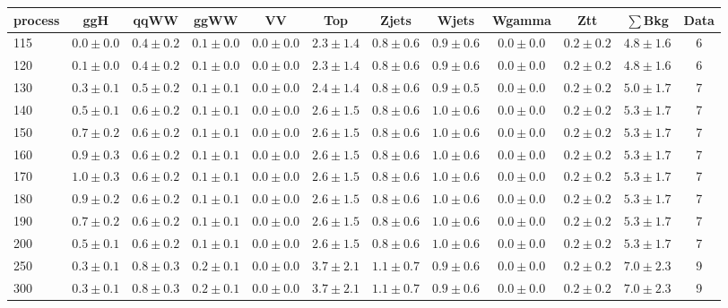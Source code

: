 \begin{table}
{\footnotesize
 \begin{center}
 \begin{tabular}{l c c c c c c c c c c c }
 \hline
 process & ggH & qqWW & ggWW & VV & Top & Zjets & Wjets & Wgamma & Ztt & $\sum$Bkg & Data \\
 \hline
115 & $0.0\pm0.0$ & $0.4\pm0.2$ & $0.1\pm0.0$ & $0.0\pm0.0$ & $2.3\pm1.4$ & $0.8\pm0.6$ & $0.9\pm0.6$ & $0.0\pm0.0$ & $0.2\pm0.2$ & $4.8\pm1.6$ & 6 \\
120 & $0.1\pm0.0$ & $0.4\pm0.2$ & $0.1\pm0.0$ & $0.0\pm0.0$ & $2.3\pm1.4$ & $0.8\pm0.6$ & $0.9\pm0.6$ & $0.0\pm0.0$ & $0.2\pm0.2$ & $4.8\pm1.6$ & 6 \\
130 & $0.3\pm0.1$ & $0.5\pm0.2$ & $0.1\pm0.1$ & $0.0\pm0.0$ & $2.4\pm1.4$ & $0.8\pm0.6$ & $0.9\pm0.5$ & $0.0\pm0.0$ & $0.2\pm0.2$ & $5.0\pm1.7$ & 7 \\
140 & $0.5\pm0.1$ & $0.6\pm0.2$ & $0.1\pm0.1$ & $0.0\pm0.0$ & $2.6\pm1.5$ & $0.8\pm0.6$ & $1.0\pm0.6$ & $0.0\pm0.0$ & $0.2\pm0.2$ & $5.3\pm1.7$ & 7 \\
150 & $0.7\pm0.2$ & $0.6\pm0.2$ & $0.1\pm0.1$ & $0.0\pm0.0$ & $2.6\pm1.5$ & $0.8\pm0.6$ & $1.0\pm0.6$ & $0.0\pm0.0$ & $0.2\pm0.2$ & $5.3\pm1.7$ & 7 \\
160 & $0.9\pm0.3$ & $0.6\pm0.2$ & $0.1\pm0.1$ & $0.0\pm0.0$ & $2.6\pm1.5$ & $0.8\pm0.6$ & $1.0\pm0.6$ & $0.0\pm0.0$ & $0.2\pm0.2$ & $5.3\pm1.7$ & 7 \\
170 & $1.0\pm0.3$ & $0.6\pm0.2$ & $0.1\pm0.1$ & $0.0\pm0.0$ & $2.6\pm1.5$ & $0.8\pm0.6$ & $1.0\pm0.6$ & $0.0\pm0.0$ & $0.2\pm0.2$ & $5.3\pm1.7$ & 7 \\
180 & $0.9\pm0.2$ & $0.6\pm0.2$ & $0.1\pm0.1$ & $0.0\pm0.0$ & $2.6\pm1.5$ & $0.8\pm0.6$ & $1.0\pm0.6$ & $0.0\pm0.0$ & $0.2\pm0.2$ & $5.3\pm1.7$ & 7 \\
190 & $0.7\pm0.2$ & $0.6\pm0.2$ & $0.1\pm0.1$ & $0.0\pm0.0$ & $2.6\pm1.5$ & $0.8\pm0.6$ & $1.0\pm0.6$ & $0.0\pm0.0$ & $0.2\pm0.2$ & $5.3\pm1.7$ & 7 \\
200 & $0.5\pm0.1$ & $0.6\pm0.2$ & $0.1\pm0.1$ & $0.0\pm0.0$ & $2.6\pm1.5$ & $0.8\pm0.6$ & $1.0\pm0.6$ & $0.0\pm0.0$ & $0.2\pm0.2$ & $5.3\pm1.7$ & 7 \\
250 & $0.3\pm0.1$ & $0.8\pm0.3$ & $0.2\pm0.1$ & $0.0\pm0.0$ & $3.7\pm2.1$ & $1.1\pm0.7$ & $0.9\pm0.6$ & $0.0\pm0.0$ & $0.2\pm0.2$ & $7.0\pm2.3$ & 9 \\
300 & $0.3\pm0.1$ & $0.8\pm0.3$ & $0.2\pm0.1$ & $0.0\pm0.0$ & $3.7\pm2.1$ & $1.1\pm0.7$ & $0.9\pm0.6$ & $0.0\pm0.0$ & $0.2\pm0.2$ & $7.0\pm2.3$ & 9 \\

\end{tabular}
\end{center}}
\end{table}
